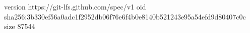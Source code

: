 version https://git-lfs.github.com/spec/v1
oid sha256:3b330ef56a0adc1f2952db06f76e6f4b0e8140b521243e95a54efd9d80407c0c
size 87544

